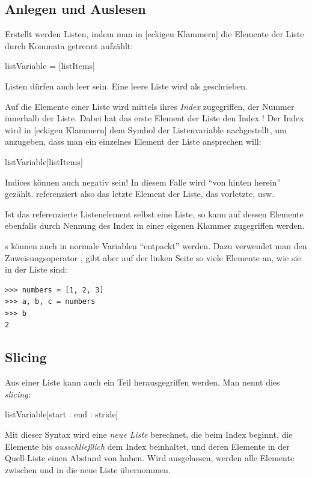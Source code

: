 \subsection{Anlegen und Auslesen}
Erstellt werden Listen, indem man in [eckigen Klammern] die Elemente der Liste durch Kommata getrennt aufzählt:
\begin{codebox}
listVariable = [listItems]
\end{codebox}

Listen dürfen auch leer sein. Eine leere Liste wird als \inPy{[]} geschrieben.

Auf die Elemente einer Liste wird mittels ihres \emph{Index} zugegriffen, \ie der Nummer innerhalb der Liste. Dabei hat das erste Element der Liste den Index ! Der Index wird in [eckigen Klammern] dem Symbol der Listenvariable nachgestellt, um anzugeben, dass man ein einzelnes Element der Liste ansprechen will:

\begin{codebox}
listVariable[listItems]
\end{codebox}

Indices können auch negativ sein! In diesem Falle wird \enquote{von hinten herein} gezählt.  referenziert also das letzte Element der Liste,  das vorletzte, usw.

Ist das referenzierte Listenelement selbst eine Liste, so kann auf dessen Elemente ebenfalls durch Nennung des Index in einer eigenen Klammer zugegriffen werden.

s können auch in normale Variablen \enquote{entpackt} werden. Dazu verwendet man den Zuweisungsoperator \inPy{=}, gibt aber auf der linken Seite so viele Elemente an, wie sie in der Liste sind:
\begin{cmdbox}
\begin{verbatim}
>>> numbers = [1, 2, 3]
>>> a, b, c = numbers
>>> b
2
\end{verbatim}
\end{cmdbox}


\subsection{Slicing}
Aus einer Liste kann auch ein Teil herausgegriffen werden. Man nennt dies \emph{slicing}:
\begin{codebox}
listVariable[start : end : stride]
\end{codebox}
Mit dieser Syntax wird eine \emph{neue Liste} berechnet, die beim Index  beginnt, die Elemente bis \emph{ausschließlich} dem Index  beinhaltet, und deren Elemente in der Quell-Liste einen Abstand von  haben. Wird  ausgelassen, werden alle Elemente zwischen  und  in die neue Liste übernommen.

